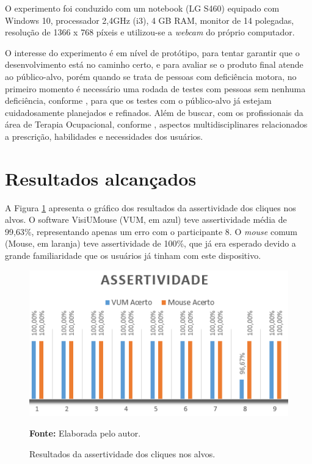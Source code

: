 O experimento foi conduzido com um notebook (LG S460) equipado com Windows 10, processador 2,4GHz (i3), 4 GB RAM, monitor de 14 polegadas, resolução de 1366 x 768 píxeis e utilizou-se a \textit{webcam} do próprio computador.

O interesse do experimento é em nível de protótipo, para tentar garantir que o desenvolvimento está no caminho certo, e para avaliar se o produto final atende ao público-alvo, porém quando se trata de pessoas com deficiência motora, no primeiro momento é necessário uma rodada de testes com pessoas sem nenhuma deficiência, conforme \cite{stone2005user}, para que os testes com o público-alvo já estejam cuidadosamente planejados e refinados. Além de buscar, com os profissionais da área de Terapia Ocupacional, conforme \cite{oliveira2015uso}, aspectos multidisciplinares relacionados a prescrição, habilidades e necessidades dos usuários.

\section{Resultados alcançados}\label{Sub:resultados-ex-1}
A Figura \ref{fig:assertividade} apresenta o gráfico dos resultados da assertividade dos cliques nos alvos. O software VisiUMouse (VUM, em azul) teve assertividade média de 99,63\%, representando apenas um erro com o participante 8. O \textit{mouse} comum (Mouse, em laranja) teve assertividade de 100\%, que já era esperado devido a grande familiaridade que os usuários já tinham com este dispositivo.

\begin{figure}[H]
\caption{Resultados da assertividade dos cliques nos alvos.} 
\centering \includegraphics[scale=1]{img/assertividade.png}

{\fontsize{11}{11}\selectfont \textbf{Fonte:} Elaborada pelo autor.}
\label{fig:assertividade}
\end{figure}


